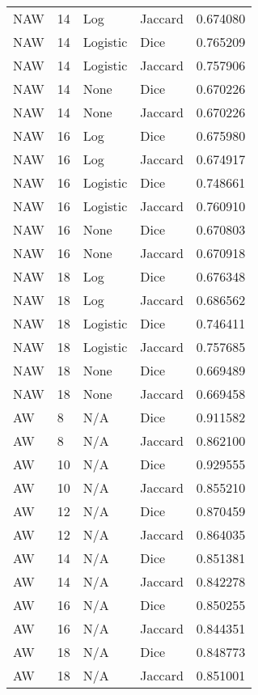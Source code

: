 \documentclass{article}
\begin{document}
\begin{center}
\begin{supertabular}{| l | l | l | l | l |}
            NAW & 14 & Log & Jaccard & 0.674080 \\
            NAW & 14 & Logistic & Dice & 0.765209 \\
            NAW & 14 & Logistic & Jaccard & 0.757906 \\
            NAW & 14 & None & Dice & 0.670226 \\
            NAW & 14 & None & Jaccard & 0.670226 \\
            NAW & 16 & Log & Dice & 0.675980 \\
            NAW & 16 & Log & Jaccard & 0.674917 \\
            NAW & 16 & Logistic & Dice & 0.748661 \\
            NAW & 16 & Logistic & Jaccard & 0.760910 \\
            NAW & 16 & None & Dice & 0.670803 \\
            NAW & 16 & None & Jaccard & 0.670918 \\
            NAW & 18 & Log & Dice & 0.676348 \\
            NAW & 18 & Log & Jaccard & 0.686562 \\
            NAW & 18 & Logistic & Dice & 0.746411 \\
            NAW & 18 & Logistic & Jaccard & 0.757685 \\
            NAW & 18 & None & Dice & 0.669489 \\
            NAW & 18 & None & Jaccard & 0.669458 \\
            AW & 8 & N/A & Dice & 0.911582 \\
            AW & 8 & N/A & Jaccard & 0.862100 \\
            AW & 10 & N/A & Dice & 0.929555 \\
            AW & 10 & N/A & Jaccard & 0.855210 \\
            AW & 12 & N/A & Dice & 0.870459 \\
            AW & 12 & N/A & Jaccard & 0.864035 \\
            AW & 14 & N/A & Dice & 0.851381 \\
            AW & 14 & N/A & Jaccard & 0.842278 \\
            AW & 16 & N/A & Dice & 0.850255 \\
            AW & 16 & N/A & Jaccard & 0.844351 \\
            AW & 18 & N/A & Dice & 0.848773 \\
            AW & 18 & N/A & Jaccard & 0.851001 \\

\end{supertabular}
\end{center}
\end{document}

